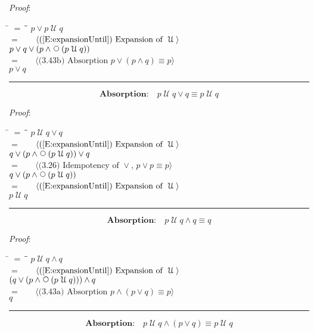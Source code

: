 \documentclass[12pt, fleqn, leqno]{article}
\newcommand{\lgap}{2pt}                             %
\newcommand{\mymathindent}{24pt}                    %
\newcommand{\Until}{\;\mathcal{U}\;}
\newcommand{\Next}{\;\,\text{\raisebox{3.5pt}{\circle{6}}}}
\newcommand{\myqed}{\rule[-.23ex]{1.2ex}{2.0ex}}
\newcommand{\myqedtab}{\hspace{384pt}}              %
\newcommand{\Gll} {\langle}                         %
\newcommand{\Ggg} {\rangle}                         %
\newcommand{\Hint}[1]     {\ \ \ $\Gll              \mbox{#1} \Ggg$ }   %
\begin{document}
\emph{Proof}:
\begin{tabbing}
\hspace{\mymathindent} \= $= \;$ \= \myqedtab \= \kill
  \> \>   $p \lor p \Until q$\\[\lgap]
  \> $=$  \>  \Hint{(\ref{E:expansionUntil}) Expansion of $\Until$}\\[\lgap]
  \> \>   $p \lor q \lor (p \land \Next(p \Until q))$\\[\lgap]
  \> $=$  \>  \Hint{(3.43b) Absorption $p \lor (p \land q) \equiv p$}\\[\lgap]
  \> \>   $p \lor q$ \quad \myqed
\end{tabbing}
\begin{equation}\label{E:untilOrQ}
\textbf{Absorption:}\quad p \Until q \lor q \equiv p \Until q
\end{equation}

\emph{Proof}:
\begin{tabbing}
\hspace{\mymathindent} \= $= \;$ \= \myqedtab \= \kill
  \> \>   $p \Until q \lor q$\\[\lgap]
  \> $=$  \>  \Hint{(\ref{E:expansionUntil}) Expansion of $\Until$}\\[\lgap]
  \> \>   $q \lor (p \land \Next(p \Until q)) \lor q$\\[\lgap]
  \> $=$  \>  \Hint{(3.26) Idempotency of $\lor$, $p \lor p \equiv p$}\\[\lgap]
  \> \>   $q \lor (p \land \Next(p \Until q))$\\[\lgap]
  \> $=$  \>  \Hint{(\ref{E:expansionUntil}) Expansion of $\Until$}\\[\lgap]
  \> \>   $p \Until q$ \quad \myqed
\end{tabbing}
\begin{equation}\label{E:untilAndQ}
\textbf{Absorption:}\quad p \Until q \land q \equiv q
\end{equation}

\emph{Proof}:
\begin{tabbing}
\hspace{\mymathindent} \= $= \;$ \= \myqedtab \= \kill
  \> \>   $p \Until q \land q$\\[\lgap]
  \> $=$  \>  \Hint{(\ref{E:expansionUntil}) Expansion of $\Until$}\\[\lgap]
  \> \>   $(q \lor (p \land \Next(p \Until q))) \land q$\\[\lgap]
  \> $=$  \>  \Hint{(3.43a) Absorption $p \land (p \lor q) \equiv p$}\\[\lgap]
  \> \>   $q$ \quad \myqed
\end{tabbing}
\begin{equation}\label{E:untilAndOr}
\textbf{Absorption:}\quad p \Until q \land (p \lor q) \equiv p \Until q
\end{equation}
\end{document}
